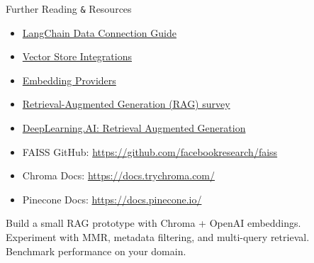 \documentclass[aspectratio=169,11pt]{beamer}
\begin{document}
\begin{frame}{Further Reading \texttt{\&} Resources}
  \begin{itemize}
    \setlength{\itemsep}{1pt}
    \item \href{https://python.langchain.com/docs/modules/data_connection/}{LangChain Data Connection Guide}
    \item \href{https://python.langchain.com/docs/integrations/vectorstores/}{Vector Store Integrations}
    \item \href{https://python.langchain.com/docs/integrations/embedding_providers/}{Embedding Providers}
    \item \href{https://arxiv.org/abs/2310.04267}{Retrieval-Augmented Generation (RAG) survey}
    \item \href{https://www.deeplearning.ai/short-courses/}{DeepLearning.AI: Retrieval Augmented Generation}
    \item FAISS GitHub: \url{https://github.com/facebookresearch/faiss}
    \item Chroma Docs: \url{https://docs.trychroma.com/}
    \item Pinecone Docs: \url{https://docs.pinecone.io/}
  \end{itemize}

  \vspace{0.05cm}
  \begin{tipbox}
    Build a small RAG prototype with Chroma + OpenAI embeddings.\\
    Experiment with MMR, metadata filtering, and multi-query retrieval.\\
    Benchmark performance on your domain.
  \end{tipbox}
\end{frame}
\end{document}
